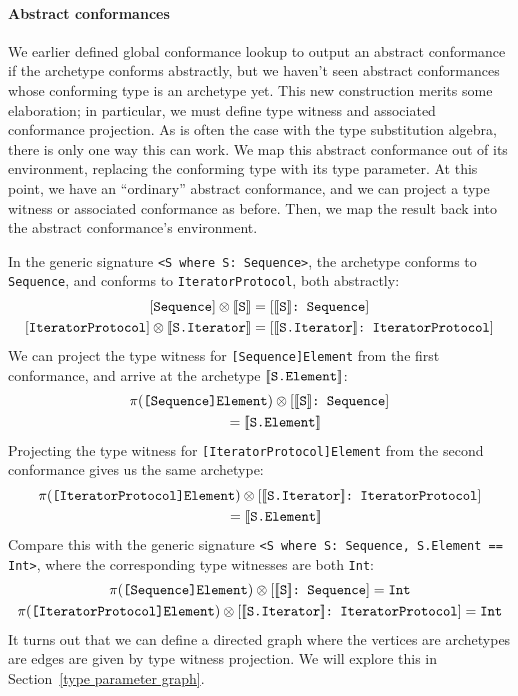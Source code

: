 \documentclass[../generics]{subfiles}
\begin{document}
\paragraph{Abstract conformances}
We earlier defined global conformance lookup to output an abstract conformance if the archetype conforms abstractly, but we haven't seen abstract conformances whose conforming type is an archetype yet. This new construction merits some elaboration; in particular, we must define type witness and associated conformance projection. As is often the case with the type substitution algebra, there is only one way this can work. We map this abstract conformance out of its environment, replacing the conforming type with its type parameter. At this point, we have an ``ordinary'' abstract conformance, and we can project a type witness or associated conformance as before. Then, we map the result back into the abstract conformance's environment.

In the generic signature \verb|<S where S: Sequence>|, the archetype  conforms to \texttt{Sequence}, and  conforms to \texttt{IteratorProtocol}, both abstractly:
\begin{gather*}
\Proto{Sequence}\otimes \archetype{S} = \ConfReq{$\archetype{S}$}{Sequence}\\
\Proto{IteratorProtocol}\otimes \archetype{S.Iterator} = \ConfReq{$\archetype{S.Iterator}$}{IteratorProtocol}
\end{gather*}
We can project the type witness for \texttt{[Sequence]Element} from the first conformance, and arrive at the archetype $[\![\texttt{S.Element}]\!]$:
\begin{gather*}
\pi(\texttt{[Sequence]Element}) \otimes [\texttt{$[\![\texttt{S}]\!]$:~Sequence}]\\
\qquad {} = [\![\texttt{S.Element}]\!]
\end{gather*}
Projecting the type witness for \texttt{[IteratorProtocol]Element} from the second conformance gives us the same archetype:
\begin{gather*}
\pi(\texttt{[IteratorProtocol]Element})\otimes [\texttt{$[\![\texttt{S.Iterator}]\!]$:~IteratorProtocol}]\\
\qquad {} = [\![\texttt{S.Element}]\!] 
\end{gather*}
Compare this with the generic signature \verb|<S where S: Sequence, S.Element == Int>|, where the corresponding type witnesses are both \texttt{Int}:
\begin{gather*}
\pi(\texttt{[Sequence]Element}) \otimes [\texttt{$[\![\texttt{S}]\!]$:~Sequence}] = \texttt{Int} \\
\pi(\texttt{[IteratorProtocol]Element})\otimes [\texttt{$[\![\texttt{S.Iterator}]\!]$:~IteratorProtocol}] = \texttt{Int}
\end{gather*}
It turns out that we can define a directed graph where the vertices are archetypes are edges are given by type witness projection. We will explore this in Section~\ref{type parameter graph}.
\end{document}
